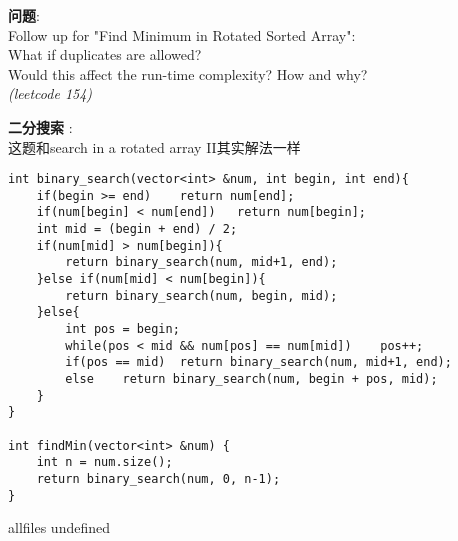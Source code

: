\documentclass{article}
\begin{document}
\begin{CJK}{UTF8}{gbsn}     %

\else
    
\begin{description}
    \item{\textbf{问题}}: \\
Follow up for "Find Minimum in Rotated Sorted Array":\\
What if duplicates are allowed?\\
Would this affect the run-time complexity? How and why?\\
\textit{(leetcode 154)}
    \item{\textbf{二分搜索}} : 
    \\这题和search in a rotated array II其实解法一样
    \begin{lstlisting}
int binary_search(vector<int> &num, int begin, int end){
	if(begin >= end)	return num[end];
	if(num[begin] < num[end])	return num[begin];
	int mid = (begin + end) / 2;
	if(num[mid] > num[begin]){
		return binary_search(num, mid+1, end);
	}else if(num[mid] < num[begin]){
		return binary_search(num, begin, mid);
	}else{
		int pos = begin;
		while(pos < mid && num[pos] == num[mid])	pos++;
		if(pos == mid)	return binary_search(num, mid+1, end);
		else	return binary_search(num, begin + pos, mid);
	}
}

int findMin(vector<int> &num) {
	int n = num.size();
	return binary_search(num, 0, n-1);
}
    \end{lstlisting}
\end{description}

\fi

\ifx allfiles undefined
\end{CJK}
\end{document}
